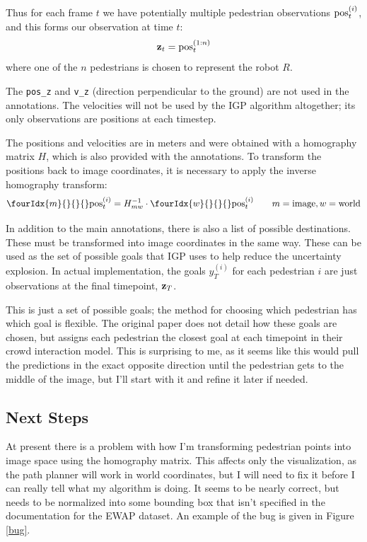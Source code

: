 \documentclass[a4paper,11pt,headings=small]{article}
\begin{document}
Thus for each frame $t$ we have potentially multiple pedestrian observations $\mathrm{pos}^{(i)}_t$, and this forms our observation at time $t$:
$$ \mathbf{z}_t = \mathrm{pos}^{(1:n)}_t $$
where one of the $n$ pedestrians is chosen to represent the robot $R$.

The \texttt{pos\_z} and \texttt{v\_z} (direction perpendicular to the ground) are not used in the annotations. The velocities will not be used by the IGP algorithm altogether; its only observations are positions at each timestep.

The positions and velocities are in meters and were obtained with a homography matrix $H$, which is also provided with the annotations. To transform the positions back to image coordinates, it is necessary to apply the inverse homography transform:
$$ \fourIdx{m}{}{}{}\post = H_{mw}^{-1} \cdot \fourIdx{w}{}{}{}\post \qquad m = \mathrm{image}, w = \mathrm{world} $$

In addition to the main annotations, there is also a list of possible destinations. These must be transformed into image coordinates in the same way. These can be used as the set of possible goals that IGP uses to help reduce the uncertainty explosion. In actual implementation, the goals $y^{(i)}_T$ for each pedestrian $i$ are just observations at the final timepoint, $\mathbf{z}_T$.

This is just a set of possible goals; the method for choosing which pedestrian has which goal is flexible. The original paper does not detail how these goals are chosen, but \cite{Pellegrini2009} assigns each pedestrian the closest goal at each timepoint in their crowd interaction model. This is surprising to me, as it seems like this would pull the predictions in the exact opposite direction until the pedestrian gets to the middle of the image, but I'll start with it and refine it later if needed.

\subsection*{Next Steps}
\quad At present there is a problem with how I'm transforming pedestrian points into image space using the homography matrix. This affects only the visualization, as the path planner will work in world coordinates, but I will need to fix it before I can really tell what my algorithm is doing. It seems to be nearly correct, but needs to be normalized into some bounding box that isn't specified in the documentation for the EWAP dataset. An example of the bug is given in Figure \ref{bug}.
\end{document}
